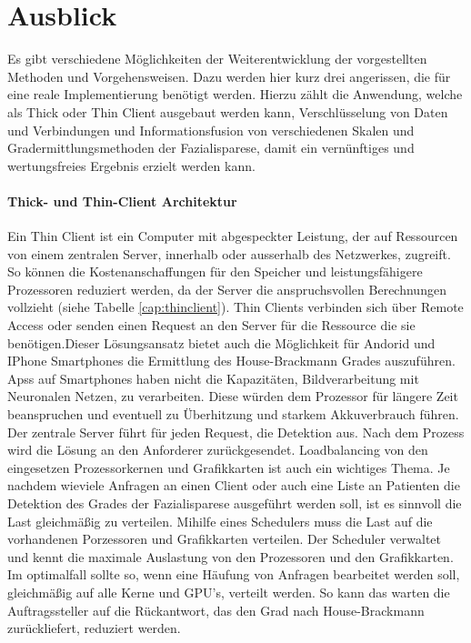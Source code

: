 \section{Ausblick}\label{next}
Es gibt verschiedene Möglichkeiten der Weiterentwicklung der vorgestellten Methoden und Vorgehensweisen. Dazu werden hier kurz drei angerissen, die für eine reale Implementierung benötigt werden. Hierzu zählt die Anwendung, welche als Thick oder Thin Client ausgebaut werden kann, Verschlüsselung von Daten und Verbindungen und Informationsfusion von verschiedenen Skalen und Gradermittlungsmethoden der Fazialisparese, damit ein vernünftiges und wertungsfreies Ergebnis erzielt werden kann.

\paragraph{Thick- und Thin-Client Architektur}\label{client}
Ein Thin Client ist ein Computer mit abgespeckter Leistung, der auf Ressourcen von einem zentralen Server, innerhalb oder ausserhalb des Netzwerkes, zugreift. So können die Kostenanschaffungen für den Speicher und leistungsfähigere Prozessoren reduziert werden, da der Server die anspruchsvollen Berechnungen vollzieht (siehe Tabelle \ref{cap:thinclient}). Thin Clients verbinden sich über Remote Access oder senden einen Request an den Server für die Ressource die sie benötigen.Dieser Lösungsansatz bietet auch die Möglichkeit für Andorid und IPhone Smartphones die Ermittlung des House-Brackmann Grades auszuführen. Apss auf Smartphones haben nicht die Kapazitäten, Bildverarbeitung mit Neuronalen Netzen, zu verarbeiten. Diese würden dem Prozessor für längere Zeit beanspruchen und eventuell zu Überhitzung und starkem Akkuverbrauch führen. Der zentrale Server führt für jeden Request, die Detektion aus. Nach dem Prozess wird die Lösung an den Anforderer zurückgesendet. Loadbalancing von den eingesetzen Prozessorkernen und Grafikkarten ist auch ein wichtiges Thema. Je nachdem wieviele Anfragen an einen Client oder auch eine Liste an Patienten die Detektion des Grades der Fazialisparese ausgeführt werden soll, ist es sinnvoll die Last gleichmäßig zu verteilen. Mihilfe eines Schedulers muss die Last auf die vorhandenen Porzessoren und Grafikkarten verteilen. Der Scheduler verwaltet und kennt die maximale Auslastung von den Prozessoren und den Grafikkarten. Im optimalfall sollte so, wenn eine Häufung von Anfragen bearbeitet werden soll, gleichmäßig auf alle Kerne und GPU's, verteilt werden. So kann das warten die Auftragssteller auf die Rückantwort, das den Grad nach House-Brackmann zurückliefert, reduziert werden.

